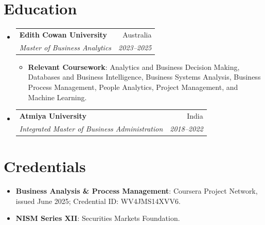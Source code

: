 \documentclass[letterpaper,9.5pt]{article}
\makeatletter
\newcommand{\resumeItem}[2]{
  \item\small{
    \textbf{#1}{: #2 \vspace{-2pt}}
  }
}
\newcommand{\resumeSubheading}[4]{
  \vspace{-1pt}\item
    \begin{tabular*}{0.97\textwidth}{l@{\extracolsep{\fill}}r}
      \textbf{#1} & #2 \\
      \textit{\small #3} & \textit{\small #4} \\
    \end{tabular*}\vspace{-5pt}
}
\newcommand{\resumeSubItem}[2]{\resumeItem{#1}{#2}\vspace{-4pt}}
\newcommand{\resumeSubHeadingListStart}{\begin{itemize}[leftmargin=*]}
\newcommand{\resumeSubHeadingListEnd}{\end{itemize}}
\newcommand{\resumeItemListStart}{\begin{itemize}}
\newcommand{\resumeItemListEnd}{\end{itemize}\vspace{-5pt}}
\makeatother
\begin{document}
\section{Education}
\resumeSubHeadingListStart
  \resumeSubheading
    {Edith Cowan University}{Australia}
    {Master of Business Analytics}{2023--2025}
    \resumeItemListStart
      \resumeItem{Relevant Coursework}
        {Analytics and Business Decision Making, Databases and Business Intelligence, Business Systems Analysis, Business Process Management, People Analytics, Project Management, and Machine Learning.}
    \resumeItemListEnd
  \resumeSubheading
    {Atmiya University}{India}
    {Integrated Master of Business Administration}{2018--2022}
\resumeSubHeadingListEnd

\section{Credentials}
\resumeSubHeadingListStart
  \resumeSubItem{Business Analysis \& Process Management}
    {Coursera Project Network, issued June 2025; Credential ID: WV4JMS14XVV6.}
  \resumeSubItem{NISM Series XII}
    {Securities Markets Foundation.}
\resumeSubHeadingListEnd
\end{document}
